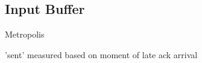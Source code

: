\subsection{Input Buffer}
\begin{frame}[fragile]{Metropolis}
  \begin{center}
        \tiny 'sent' measured based on moment of late ack arrival
  \end{center}
  
  \begin{columns}[T] %
    \begin{column}{.48\textwidth}
        \texttt{[image: \$\{flesnet\_input\_buffer\_usage]}}
    \end{column}
    \hfill
    \begin{column}{.48\textwidth}
        \texttt{[image: \$\{dfs\_input\_buffer\_usage]}}
    \end{column}
    \end{columns}
\end{frame}